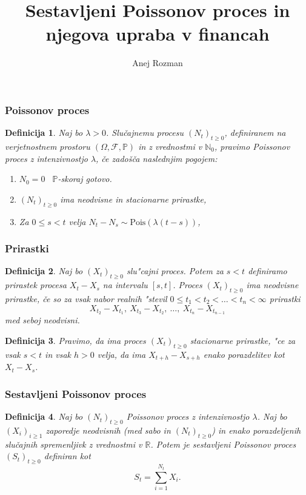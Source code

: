 \documentclass[]{beamer} %
\title[CPP in njegova uporaba v financah]{Sestavljeni Poissonov proces in njegova upraba v financah}
\subtitle{}
\author[Anej Rozman]{Anej Rozman}
\institute[]{Mentor: doc.~dr. Martin Raič}
\date[]{}
\theoremstyle{plain}
\newtheorem{definicija}{Definicija}
\newcommand{\Prob}{\mathbb{P}}
\newcommand{\1}{\mathds{1}}
\newcommand{\Pois}[1]{\text{Pois}(#1)}
\begin{document}
\frame{\titlepage}

\begin{frame}
  \frametitle{Poissonov proces}
  \begin{definicija}
    Naj bo $\lambda > 0$. Slučajnemu procesu $(N_t)_{t\geq 0}$, definiranem na verjetnostnem 
    prostoru $(\Omega, \mathcal{F}, \mathbb{P})$ in z vrednostmi v $\mathbb{N}_0$, pravimo 
    \textit{Poissonov proces} z intenzivnostjo $\lambda$, če zadošča naslednjim pogojem:
    \begin{enumerate}
        \item $N_0 = 0$ \ $\Prob$-skoraj gotovo.
        \item $(N_t)_{t\geq 0}$ ima neodvisne in stacionarne prirastke,
        \item Za $0 \leq s < t$ velja $ N_t - N_s \sim\Pois{\lambda(t - s)}$,
    \end{enumerate}
  \end{definicija}
\end{frame}

\begin{frame}
  \frametitle{Prirastki}
  \begin{definicija}
    Naj bo $(X_t)_{t\geq0}$ slu"cajni proces. Potem za $s < t$ definiramo
    \textit{prirastek procesa} $X_t - X_s$ na intervalu $[s, t]$. Proces $(X_t)_{t\geq0}$ ima 
    \textit{neodvisne prirastke}, če so za vsak nabor realnih "stevil
    $0 \leq t_1 < t_2 < \ldots < t_n < \infty$ prirastki
    $$
        X_{t_2} - X_{t_1}, \ X_{t_3} - X_{t_2}, \ \ldots, \ X_{t_n} - X_{t_{n-1}}
    $$
    med seboj neodvisni.
    \label{def:prirastek}
    \end{definicija}
    \pause
    \begin{definicija}
    Pravimo, da ima proces $(X_t)_{t\geq0}$
    \textit{stacionarne prirastke}, "ce za vsak $s < t$ in vsak $h > 0$ velja, 
    da ima $X_{t+h} - X_{s+h}$ enako porazdelitev kot $X_t - X_s$.
    \label{def:stacPrir}
    \end{definicija}

  \end{frame}

\begin{frame}
  \frametitle{Sestavljeni Poissonov proces}
  \begin{definicija}
    Naj bo $(N_t)_{t\geq0}$ Poissonov proces z intenzivnostjo $\lambda$. 
    Naj bo $(X_i)_{i\geq1}$ zaporedje neodvisnih (med sabo in $(N_t)_{t\geq0}$) in enako 
    porazdeljenih slučajnih spremenljivk z vrednostmi v $\mathbb{R}$. Potem je 
    \textit{sestavljeni Poissonov proces} $(S_t)_{t\geq0}$ definiran kot
    $$
        S_t = \sum_{i=1}^{N_t} X_i.
    $$
    \label{def:CPP}
\end{definicija}

\end{frame}
\end{document}
